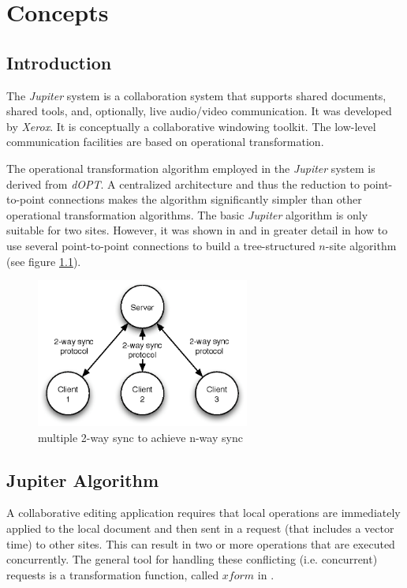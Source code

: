 \chapter{Concepts}
\section{Introduction}
The \emph{Jupiter} system is a collaboration system that supports shared documents, shared tools, and, optionally, live audio/video communication. It was developed by \emph{Xerox}. It is conceptually a collaborative windowing toolkit. The low-level communication facilities are based on operational transformation.

The operational transformation algorithm employed in the \emph{Jupiter} system is derived from \emph{dOPT}. A centralized architecture and thus the reduction to point-to-point connections makes the algorithm significantly simpler than other operational transformation algorithms. The basic \emph{Jupiter} algorithm is only suitable for two sites. However, it was shown in \cite{jupiter95} and in greater detail in \cite{netedit:thesis} how to use several point-to-point connections to build a tree-structured $n$-site algorithm (see figure \ref{fig:concepts.nway}).

\begin{figure}[htb]
 \centering
 \includegraphics[width=7cm,height=4.89cm]{../../images/concepts_nway.eps}
 \caption{multiple 2-way sync to achieve n-way sync}
 \label{fig:concepts.nway}
\end{figure}

\section{Jupiter Algorithm}
A collaborative editing application requires that local operations are immediately applied to the local document and then sent in a request (that includes a vector time) to other sites. This can result in two or more operations that are executed concurrently. The general tool for handling these conflicting (i.e. concurrent) requests is a transformation function, called $xform$ in \cite{jupiter95}.

